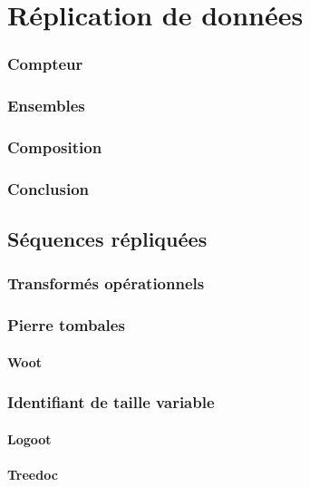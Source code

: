 
\part{Réplication de données}








\section{Compteur}
\section{Ensembles}
\section{Composition}
\section{Conclusion}

\chapter{Séquences répliquées}
\minitoc

\section{Transformés opérationnels}
\section{Pierre tombales}
\subsection{Woot}
\section{Identifiant de taille variable}
\subsection{Logoot}
\subsection{Treedoc}

